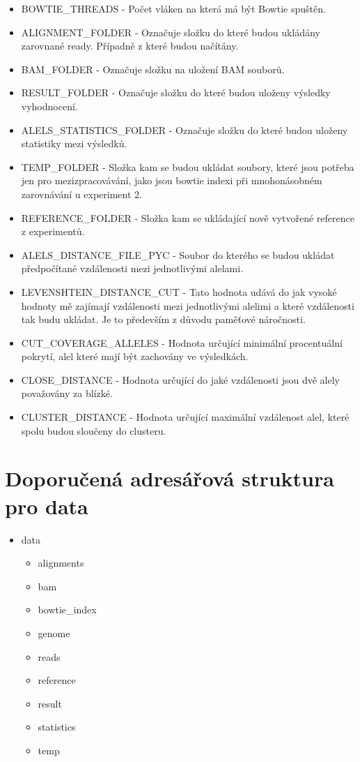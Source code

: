 \documentclass[czech,DP]{thesiskiv}
\numberwithin{equation}{section}
\begin{document}
\begin{itemize}
	\item BOWTIE\_THREADS - Počet vláken na která má být Bowtie spuštěn.	
	\item ALIGNMENT\_FOLDER - Označuje složku do které budou ukládány zarovnané ready. Případně z které budou načítány. 
	\item BAM\_FOLDER - Označuje složku na uložení BAM souborů.  
	\item RESULT\_FOLDER - Označuje složku do které budou uloženy výsledky vyhodnocení.
	\item ALELS\_STATISTICS\_FOLDER - Označuje složku do které budou uloženy statistiky mezi výsledků.
	\item TEMP\_FOLDER - Složka kam se budou ukládat soubory, které jsou potřeba jen pro mezizpracovávání, jako jsou bowtie indexi při mnohonásobném zarovnávání u experiment 2.
	\item REFERENCE\_FOLDER - Složka kam se ukládající nově vytvořené reference z experimentů.
	\item ALELS\_DISTANCE\_FILE\_PYC - Soubor do kterého se budou ukládat předpočítané vzdálenosti mezi jednotlivými alelami. 
	\item LEVENSHTEIN\_DISTANCE\_CUT - Tato hodnota udává do jak vysoké hodnoty mě zajímají vzdálenosti mezi jednotlivými alelimi a které vzdálenosti tak budu ukládat. Je to především z důvodu paměťové náročnosti.
	\item CUT\_COVERAGE\_ALLELES - Hodnota určující minimální procentuální pokrytí, alel které mají být zachovány ve výsledkách.
	 \item CLOSE\_DISTANCE - Hodnota určující do jaké vzdálenosti jsou dvě alely považovány za blízké.
	 \item CLUSTER\_DISTANCE - Hodnota určující maximální vzdálenost alel, které spolu budou sloučeny do clusteru.
\end{itemize}



\section{Doporučená adresářová struktura pro data}
\begin{itemize}
	\item data
		\begin{itemize}
			\item alignments
			\item bam
			\item bowtie\_index
			\item genome
			\item reads
			\item reference			
			\item result
			\item statistics 
			\item temp
		\end{itemize}
\end{itemize}
\end{document}
